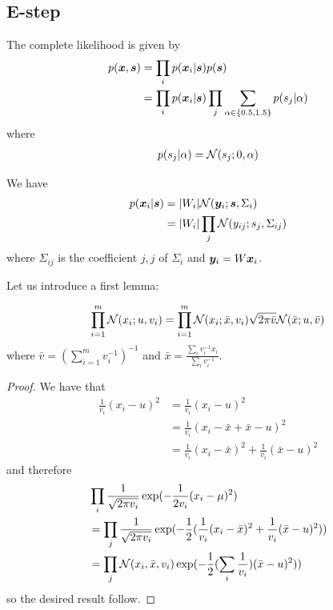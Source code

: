   \subsection{E-step}
  \label{app:emestep1}
  The complete likelihood is given by
\begin{align}
  p(\boldsymbol{x}, \boldsymbol{s}) &= \prod_i p(\boldsymbol{x}_i | \boldsymbol{s}) p(\boldsymbol{s}) \\
  &= \prod_i p(\boldsymbol{x}_i | \boldsymbol{s}) \prod_j \sum_{\alpha \in \{0.5, 1.5\}}p(s_j | \alpha) \\
\end{align}
where 
\begin{align}
  p(s_j | \alpha) = \mathcal{N}(s_j; 0, \alpha)
\end{align}

We have
\begin{align}
  p(\boldsymbol{x}_i | \boldsymbol{s}) &=|W_i|\mathcal{N}(\boldsymbol{y}_i; \boldsymbol{s}, \Sigma_i)  \\
                  &= |W_i| \prod_j \mathcal{N}(y_{ij}; s_j, \Sigma_{ij})
\end{align}
where $\Sigma_{ij}$ is the coefficient $j, j$ of $\Sigma_i$ and $\boldsymbol{y}_i = W \boldsymbol{x}_i$.

Let us introduce a first lemma:
\begin{lemma}
  \label{lemma:multmgauss}
  \begin{align*}
    \prod_{i=1}^m \mathcal{N}(x_i; u, v_i) = \prod_{i=1}^m \mathcal{N}(x_i; \bar{x}, v_i) \sqrt{2 \pi \bar{v}} \mathcal{N}(\bar{x}; u, \bar{v})
  \end{align*}
  where $\bar{v} = (\sum_{i=1}^m v_i^{-1})^{-1}$ and $\bar{x} = \frac{\sum_i v_i^{-1}
    x_i}{\sum_i v_i^{-1}}$.
\end{lemma}
\begin{proof}
  We have that
  \begin{align}
    \frac1{v_i}(x_i - u)^2 &= \frac1{v_i}(x_i - u)^2 \\
                           &=\frac1{v_i}(x_i - \bar{x} + \bar{x} - u)^2 \\
                           &=\frac1{v_i}(x_i - \bar{x})^2 + \frac1{v_i}(\bar{x} - u)^2 \label{eq:lem:multigauss}
  \end{align}
  and therefore
  \begin{align}
    &\prod_i \frac1{\sqrt{2 \pi v_i}}\exp(-\frac1{2v_i}(x_i - \mu)^2) \\
    &= \prod_j \frac1{\sqrt{2 \pi v_i}}\exp(-\frac12 (\frac1{v_i}(x_i - \bar{x})^2 + \frac1{v_i}(\bar{x} - u)^2)) \\ 
    &= \prod_j \mathcal{N}(x_i, \bar{x}, v_i) \exp(-\frac12( \sum_i \frac1{v_i})(\bar{x} - u)^2)) \\ 
  \end{align}
    so the desired result follow.
\end{proof}

